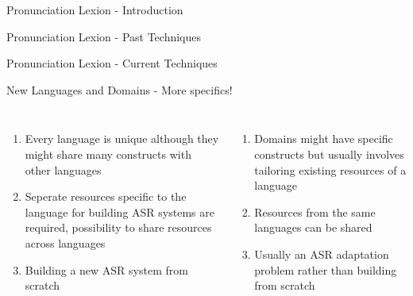 \begin{frame}{Pronunciation Lexion - Introduction}
\end{frame}

\begin{frame}{Pronunciation Lexion - Past Techniques}
\end{frame}

\begin{frame}{Pronunciation Lexion - Current Techniques}
\end{frame}

\begin{frame}{New Languages and Domains - More specifics!}
\begin{columns}[T]
\column{2in}
\centering
{\color{orange}{New Languages}}
\begin{enumerate}
\item Every language is \alert{unique} although they might share many constructs with other languages
\item \alert{Seperate resources} specific to the language for building ASR systems are required,
possibility to share resources across languages
\item \alert{Building a new ASR system from scratch}
\end{enumerate}
\column{2in}
\centering
{\color{ForestGreen}{New Domains}}
\begin{enumerate}
\item Domains might have specific constructs but usually involves \alert{tailoring existing resources} of a language
\item Resources from the same languages can be \alert{shared}
\item Usually \alert{an ASR adaptation problem} rather than building from scratch
\end{enumerate}
\end{columns}
\end{frame}

